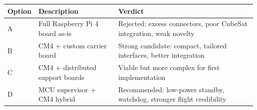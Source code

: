 \begin{longtable}{L{2.2cm}L{4.2cm}L{6.3cm}}
\toprule
\textbf{Option} & \textbf{Description} & \textbf{Verdict} \\
\midrule
A & Full Raspberry Pi 4 board as-is & Rejected: excess connectors, poor CubeSat integration, weak novelty \\
B & CM4 + custom carrier board & Strong candidate: compact, tailored interfaces, better integration \\
C & CM4 + distributed support boards & Viable but more complex for first implementation \\
D & MCU supervisor + CM4 hybrid & Recommended: low-power standby, watchdog, stronger flight credibility \\
\bottomrule
\end{longtable}
